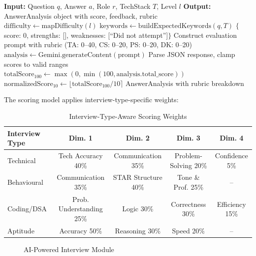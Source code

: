 \documentclass[12pt,a4paper,oneside]{report}
\begin{document}
\begin{algorithm}[H]
\caption{Real-Time Answer Analysis Algorithm}
\label{alg:answer_analysis}
\begin{algorithmic}[1]
\STATE \textbf{Input:} Question $q$, Answer $a$, Role $r$, TechStack $T$, Level $l$
\STATE \textbf{Output:} AnswerAnalysis object with score, feedback, rubric
\STATE $\text{difficulty} \gets \text{mapDifficulty}(l)$
\STATE $\text{keywords} \gets \text{buildExpectedKeywords}(q, T)$
  \RETURN $\{$score: 0, strengths: [], weaknesses: [``Did not attempt'']$\}$
\ENDIF
\STATE Construct evaluation prompt with rubric (TA: 0--40, CS: 0--20, PS: 0--20, DK: 0--20)
\STATE $\text{analysis} \gets \text{Gemini.generateContent}(\text{prompt})$
\STATE Parse JSON response, clamp scores to valid ranges
\STATE $\text{totalScore}_{\text{100}} \gets \max(0, \min(100, \text{analysis.total\_score}))$
\STATE $\text{normalizedScore}_{\text{10}} \gets \lfloor \text{totalScore}_{\text{100}} / 10 \rceil$
\RETURN AnswerAnalysis with rubric breakdown
\end{algorithmic}
\end{algorithm}

The scoring model applies interview-type-specific weights:

\begin{table}[H]
\centering
\caption{Interview-Type-Aware Scoring Weights}
\label{tab:scoring_weights}
\begin{tabular}{|l|c|c|c|c|}
\hline
\textbf{Interview Type} & \textbf{Dim. 1} & \textbf{Dim. 2} & \textbf{Dim. 3} & \textbf{Dim. 4} \\
\hline
Technical & Tech Accuracy 40\% & Communication 35\% & Problem-Solving 20\% & Confidence 5\% \\
\hline
Behavioural & Communication 35\% & STAR Structure 40\% & Tone \& Prof. 25\% & -- \\
\hline
Coding/DSA & Prob. Understanding 25\% & Logic 30\% & Correctness 30\% & Efficiency 15\% \\
\hline
Aptitude & Accuracy 50\% & Reasoning 30\% & Speed 20\% & -- \\
\hline
\end{tabular}
\end{table}

\begin{figure}[H]
\centering
{}
\caption{AI-Powered Interview Module}
\label{fig:interview_module}
\end{figure}
\end{document}

